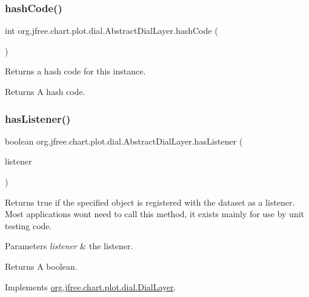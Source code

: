 \subsubsection{\texorpdfstring{hash\+Code()}{hashCode()}}
{\footnotesize\ttfamily int org.\+jfree.\+chart.\+plot.\+dial.\+Abstract\+Dial\+Layer.\+hash\+Code (\begin{DoxyParamCaption}{ }\end{DoxyParamCaption})}

Returns a hash code for this instance.

\begin{DoxyReturn}{Returns}
A hash code. 
\end{DoxyReturn}
\mbox{\label{classorg_1_1jfree_1_1chart_1_1plot_1_1dial_1_1_abstract_dial_layer_ae5ce22720d24ab3fb6cf93ddf2714a82}} 
\subsubsection{\texorpdfstring{has\+Listener()}{hasListener()}}
{\footnotesize\ttfamily boolean org.\+jfree.\+chart.\+plot.\+dial.\+Abstract\+Dial\+Layer.\+has\+Listener (\begin{DoxyParamCaption}\item[{Event\+Listener}]{listener }\end{DoxyParamCaption})}

Returns {\ttfamily true} if the specified object is registered with the dataset as a listener. Most applications won\textquotesingle{}t need to call this method, it exists mainly for use by unit testing code.


\begin{DoxyParams}{Parameters}
{\em listener} & the listener.\\
\hline
\end{DoxyParams}
\begin{DoxyReturn}{Returns}
A boolean. 
\end{DoxyReturn}


Implements \mbox{\hyperlink{interfaceorg_1_1jfree_1_1chart_1_1plot_1_1dial_1_1_dial_layer_a53485b27b00963044045bc0f20820dea}{org.\+jfree.\+chart.\+plot.\+dial.\+Dial\+Layer}}.

